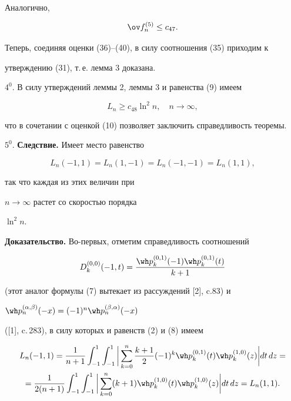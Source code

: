 Аналогично,


\begin{equation}


\ov f_n^{(5)}\le c_{47}.


\end{equation}





Теперь, соединяя оценки (36)--(40), в силу соотношения (35) приходим к


утверждению (31), т.\,е. лемма 3 доказана.


\medskip





$4^0$. В силу утверждений леммы 2, леммы 3 и равенства (9) имеем


$$


L_n\ge c_{48} \ln^2 n,\quad n\to \infty,


$$


что в сочетании с оценкой (10) позволяет заключить справедливость теоремы.


\medskip





$5^0$. {\bf Следствие.} Имеет место равенство


$$


L_n(-1,1)=L_n(1,-1)=L_n(-1,-1)=L_n(1,1),


$$


так что каждая из этих величин при


$n\to \infty$ растет со скоростью порядка


$\ln^2n$.


\medskip





{\bf Доказательство.} Во-первых, отметим справедливость соотношений


$$


D_k^{(0,0)}(-1,t)=\frac{\wh p_k^{(0,1)}(-1) \wh p_k^{(0,1)}(t)}{k+1}


$$


(этот аналог формулы (7) вытекает из рассуждений [2], c.83) и


$\wh p_n^{(\alpha,\beta)}(-x)=(-1)^n \wh p_n^{(\beta,\alpha)}(-x)$


([1], c.\,283), в силу которых и равенств (2) и (8) имеем


\begin{multline*}


L_n(-1,1)=\frac {1}{n+1}\int_{-1}^1\int_{-1}^1


\bigg|\sum_{k=0}^n \frac{k+1}{2}(-1)^k


\wh p_k^{(0,1)}(t)\wh p_k^{(1,0)}(z)\bigg|dt\, dz = \\


%


=\frac {1}{2(n+1)}\int_{-1}^1\int_{-1}^1


\bigg|\sum_{k=0}^n (k+1)


\wh p_k^{(1,0)}(t)\wh p_k^{(1,0)}(z)\bigg|dt\, dz=L_n(1,1).


\end{multline*}


